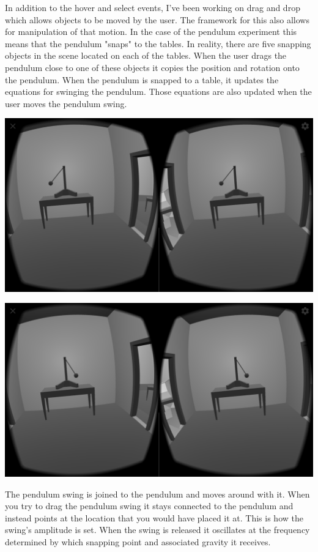 \documentclass[onecolumn, draftclsnofoot,10pt, compsoc]{IEEEtran}
\begin{document}
In addition to the hover and select events, I've been working on drag and drop which allows objects to be moved by the user.  The framework for this also allows for manipulation of that motion.  In the case of the pendulum experiment this means that the pendulum "snaps" to the tables.  In reality, there are five snapping objects in the scene located on each of the tables.  When the user drags the pendulum close to one of these objects it copies the position and rotation onto the pendulum.  When the pendulum is snapped to a table, it updates the equations for swinging the pendulum.  Those equations are also updated when the user moves the pendulum swing.

\includegraphics[width=\linewidth]{images/pend-midswing-left.png}

\includegraphics[width=\linewidth]{images/pend-midswing-right.png}

The pendulum swing is joined to the pendulum and moves around with it.  When you try to drag the pendulum swing it stays connected to the pendulum and instead points at the location that you would have placed it at.  This is how the swing's amplitude is set.  When the swing is released it oscillates at the frequency determined by which snapping point and associated gravity it receives.
\end{document}
